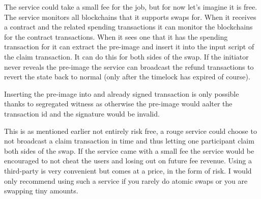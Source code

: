 The service could take a small fee for the job, but for now let's imagine it is free. The service monitors all blockchains that it supports swaps for. When it receives a contract and the related spending transactions it can monitor the blockchains for the contract transactions. When it sees one that it has the spending transaction for it can extract the pre-image and insert it into the input script of the claim transaction. It can do this for both sides of the swap. If the initiator never reveals the pre-image the service can broadcast the refund transactions to revert the state back to normal (only after the timelock has expired of course). 

Inserting the pre-image into and already signed transaction is only possible thanks to segregated witness as otherwise the pre-image would aalter the transaction id and the signature would be invalid. 

This is as mentioned earlier not entirely risk free, a rouge service could choose to not broadcast a claim transaction in time and thus letting one participant claim both sides of the swap. If the service came with a small fee the service would be encouraged to not cheat the users and losing out on future fee revenue. Using a third-party is very convenient but comes at a price, in the form of risk. I would only recommend using such a service if you rarely do atomic swaps or you are swapping tiny amounts.